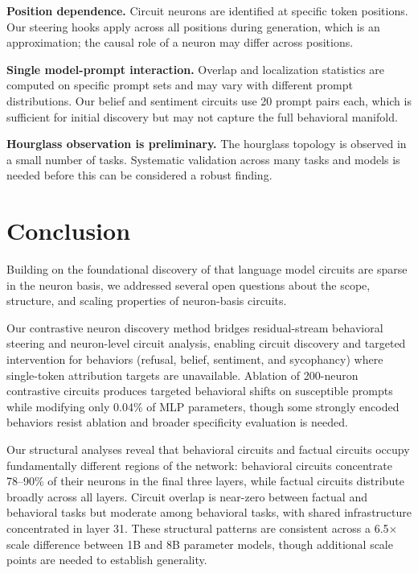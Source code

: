 \documentclass[11pt]{article}
\begin{document}
\textbf{Position dependence.}
Circuit neurons are identified at specific token positions.
Our steering hooks apply across all positions during generation, which is an approximation; the causal role of a neuron may differ across positions.

\textbf{Single model-prompt interaction.}
Overlap and localization statistics are computed on specific prompt sets and may vary with different prompt distributions.
Our belief and sentiment circuits use 20 prompt pairs each, which is sufficient for initial discovery but may not capture the full behavioral manifold.

\textbf{Hourglass observation is preliminary.}
The hourglass topology is observed in a small number of tasks.
Systematic validation across many tasks and models is needed before this can be considered a robust finding.


\section{Conclusion}
\label{sec:conclusion}

Building on the foundational discovery of \citet{arora2025circuits} that language model circuits are sparse in the neuron basis, we addressed several open questions about the scope, structure, and scaling properties of neuron-basis circuits.

Our contrastive neuron discovery method bridges residual-stream behavioral steering and neuron-level circuit analysis, enabling circuit discovery and targeted intervention for behaviors (refusal, belief, sentiment, and sycophancy) where single-token attribution targets are unavailable.
Ablation of 200-neuron contrastive circuits produces targeted behavioral shifts on susceptible prompts while modifying only 0.04\% of MLP parameters, though some strongly encoded behaviors resist ablation and broader specificity evaluation is needed.

Our structural analyses reveal that behavioral circuits and factual circuits occupy fundamentally different regions of the network: behavioral circuits concentrate 78--90\% of their neurons in the final three layers, while factual circuits distribute broadly across all layers.
Circuit overlap is near-zero between factual and behavioral tasks but moderate among behavioral tasks, with shared infrastructure concentrated in layer 31.
These structural patterns are consistent across a 6.5$\times$ scale difference between 1B and 8B parameter models, though additional scale points are needed to establish generality.
\end{document}
